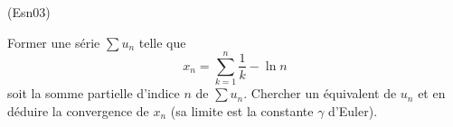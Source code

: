 \begin{tiny}(Esn03)\end{tiny} \label{Esn03} Former une série $\sum u_n$ telle que 
\begin{displaymath}
  x_n = \sum_{k=1}^{n}\frac{1}{k} - \ln n
\end{displaymath}
soit la somme partielle d'indice $n$ de $\sum u_n$. Chercher un équivalent de $u_n$ et en déduire la convergence de $x_n$ (sa limite est la constante $\gamma$ d'Euler).